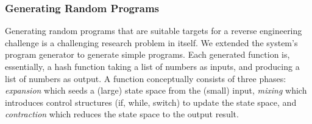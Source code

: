 \subsubsection{Generating Random Programs}
\label{sec:generate:program}

Generating random programs that are suitable targets for a reverse engineering challenge is a challenging research problem in itself. We extended the \tigress system's program generator to generate simple programs. Each generated function is, essentially, a hash function taking a list of numbers as inputs, and producing a list of numbers as output. A function conceptually consists of three phases: {\em expansion} which seeds a (large) state space from the (small) input, {\em mixing} which introduces control structures (if, while, switch) to update the state space, and {\em contraction} which reduces the state space to the output result. %


